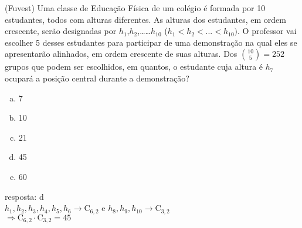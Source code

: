 \begin{ex}	
(Fuvest) Uma classe de Educação Física de um colégio é formada por 10 estudantes, todos com alturas diferentes. As alturas dos estudantes, em ordem crescente, serão designadas por $h_1$,$h_2$,……$h_{10}$  ($h_1<h_2<...<h_{10}).$
O professor vai escolher 5 desses estudantes para participar de uma demonstração na qual eles se apresentarão alinhados, em ordem crescente de suas alturas. Dos
$\binom {10} {5}= 252$ grupos que podem ser escolhidos, em quantos, o estudante cuja altura é $h_7$ ocupará a posição central durante a demonstração? 
    \begin{enumerate}[(a)]
    \item 7
    \item 10
    \item 21
    \item 45
    \item 60
    \end{enumerate}
      \begin{sol}
      resposta: d \\
     $h_1,h_2,h_3,h_4,h_5,h_6 \longrightarrow \mathrm{C }_{6,2}$\hspace{1cm} e\hspace{1cm} $h_8,h_9,h_{10} \longrightarrow \mathrm{C}_{3,2}$\\
     $\Longrightarrow \mathrm{C}_{6,2}\cdot\mathrm{C}_{3,2}=45$
     
      \end{sol}
\end{ex}